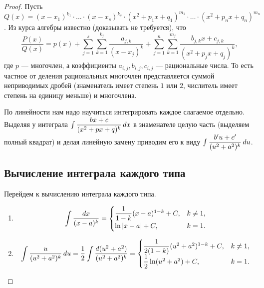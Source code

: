 \documentclass[a4paper]{article}
\theoremstyle{named}
\renewcommand{\int}{\intop}
\begin{document}
        \begin{proof}
            Пусть $Q(x) = (x - x_1)^{k_1} \cdot \dots \cdot (x - x_s)^{k_s} \cdot (x^2 + p_1x + q_1)^{m_1} \cdot \dots \cdot (x^2 + p_nx + q_n)^{m_n}$. Из курса алгебры известно (доказывать не требуется), что
            \begin{equation*}
                \dfrac{P(x)}{Q(x)} = p(x) + \sum_{j = 1}^s \sum_{k = 1}^{k_j} \dfrac{a_{j, k}}{(x - x_j)^k} + \sum_{j = 1}^n \sum_{k = 1}^{m_j} \dfrac{b_{j, k}x + c_{j, k}}{(x^2 + p_jx + q_j)^k},
            \end{equation*}
            где $p$ --- многочлен, а коэффициенты $a_{i, j}, b_{i, j}, c_{i, j}$ --- рациональные числа. То есть частное от деления рациональных многочлен представляется суммой неприводимых дробей (знаменатель имеет степень $1$ или $2$, числитель имеет степень на единицу меньше) и многочлена.

            По линейности нам надо научиться интегрировать каждое слагаемое отдельно. Выделяя у интеграла $\int \dfrac{bx + c}{(x^2 + px + q)^k} \dd x$ в знаменателе целую часть (выделяем полный квадрат) и делая линейную замену приводим его к виду $\int \dfrac{b'u + c'}{(u^2 + a^2)^k} \dd u$.

            \subsection{Вычисление интеграла каждого типа}

            Перейдем к вычислению интеграла каждого типа.

            \begin{enumerate}
            \item
                \begin{equation*}
                    \int \dfrac{\dd x}{(x - a)^k} = \begin{cases}
                        \dfrac{1}{1 - k}(x - a)^{1 - k} + C, &k \neq 1, \\
                        \ln |x - a| + C, &k = 1.
                    \end{cases}
                \end{equation*}

            \item
                \begin{equation*}
                    \int \dfrac{u}{(u^2 + a^2)^k} \dd u
                    = \dfrac{1}{2} \int \dfrac{\dd (u^2 + a^2)}{(u^2 + a^2)^k}
                    = \begin{cases}
                        \dfrac{1}{2(1 - k)}(u^2 + a^2)^{1 - k} + C, &k \neq 1, \\
                        \dfrac{1}{2} \ln(u^2 + a^2) + C, &k = 1.
                    \end{cases}
                \end{equation*}


\end{enumerate}
\end{proof}
\end{document}
